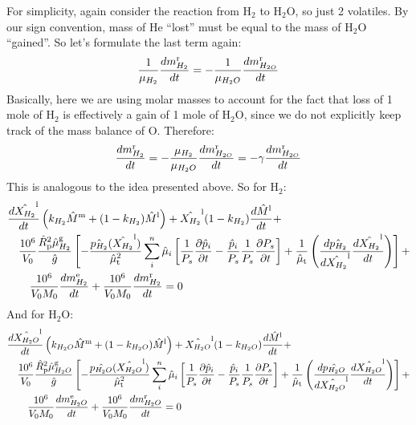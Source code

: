 For simplicity, again consider the reaction from H$_2$ to H$_2$O, so just 2 volatiles.  By our sign convention, mass of He ``lost'' must be equal to the mass of H$_2$O ``gained''.  So let's formulate the last term again:
\begin{equation}
\frac{1}{\mu_{H_2}} \frac{dm_{H_2}^{\rm r}}{dt} = - \frac{1}{\mu_{H_2O}} \frac{dm_{H_{2O}}^{\rm r}}{dt}
\end{equation}
Basically, here we are using molar masses to account for the fact that loss of 1 mole of H$_2$ is effectively a gain of 1 mole of H$_2$O, since we do not explicitly keep track of the mass balance of O.  Therefore:
\begin{equation}
\frac{dm_{H_2}^{\rm r}}{dt} = - \frac{\mu_{H_2}}{\mu_{H_2O}} \frac{dm_{H_{2O}}^{\rm r}}{dt} = -\gamma \frac{dm_{H_{2O}}^{\rm r}}{dt}
\end{equation}
This is analogous to the idea presented above.  So for H$_2$:
\begin{align}
&\frac{d \hat{X_{H_2}}^{\rm l}}{d t} \left(k_{H_2} \hat{M}^{\rm m} + (1-k_{H_2}) \hat{M}^{\rm l} \right)
+ \hat{X_{H_2}}^{\rm l} (1-k_{H_2}) \frac{d \hat{M}^{\rm l}}{d t} + \nonumber \\
&\quad \frac{10^6}{V_0} \frac{\hat{R}_{\rm p}^2 \hat{\mu}_{H_2}^{\rm g}}{\hat{g}}
\left[
-\frac{\hat{p_{H_2}}(\hat{X_{H_2}}^{\rm l})}{\hat{\mu}_{\rm t}^2} \sum_i^n \hat{\mu}_i \left[ \frac{1}{P_s} \frac{\partial \hat{p}_i}{\partial t} - \frac{\hat{p}_i}{P_s} \frac{1}{P_s} \frac{\partial P_s}{\partial t} \right] + \frac{1}{\hat{\mu}_{\rm t}} \left( \frac{d \hat{p_{H_2}}}{d \hat{X_{H_2}}^{\rm l}} \frac{d \hat{X_{H_2}}^{\rm l}}{d t} \right)
\right]+ \nonumber \\
& \qquad \frac{10^6}{V_0 M_0} \frac{dm_{H_2}^{\rm e}}{dt} + \frac{10^6}{V_0 M_0} \frac{dm_{H_2}^{\rm r}}{dt} = 0
\end{align}
And for H$_2$O:
\begin{align}
&\frac{d \hat{X_{H_2O}}^{\rm l}}{d t} \left(k_{H_2O} \hat{M}^{\rm m} + (1-k_{H_2O}) \hat{M}^{\rm l} \right)
+ \hat{X_{H_2O}}^{\rm l} (1-k_{H_2O}) \frac{d \hat{M}^{\rm l}}{d t} + \nonumber \\
&\quad \frac{10^6}{V_0} \frac{\hat{R}_{\rm p}^2 \hat{\mu}_{H_2O}^{\rm g}}{\hat{g}}
\left[
-\frac{\hat{p_{H_2O}}(\hat{X_{H_2O}}^{\rm l})}{\hat{\mu}_{\rm t}^2} \sum_i^n \hat{\mu}_i \left[ \frac{1}{P_s} \frac{\partial \hat{p}_i}{\partial t} - \frac{\hat{p}_i}{P_s} \frac{1}{P_s} \frac{\partial P_s}{\partial t} \right] + \frac{1}{\hat{\mu}_{\rm t}} \left( \frac{d \hat{p_{H_2O}}}{d \hat{X_{H_2O}}^{\rm l}} \frac{d \hat{X_{H_2O}}^{\rm l}}{d t} \right)
\right]+ \nonumber \\
& \qquad \frac{10^6}{V_0 M_0} \frac{dm_{H_2O}^{\rm e}}{dt} + \frac{10^6}{V_0 M_0} \frac{dm_{H_2O}^{\rm r}}{dt} = 0
\end{align}
